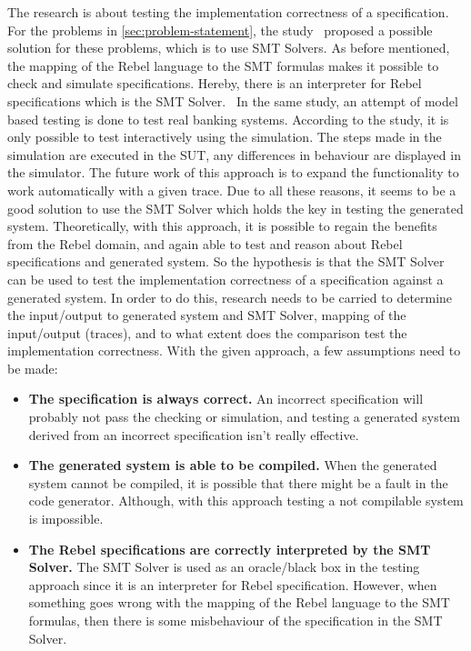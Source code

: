 The research is about testing the implementation correctness of a specification.
For the problems in \autoref{sec:problem-statement}, the
study~\cite[p.3]{stoelcase} proposed a possible solution for these problems,
which is to use SMT Solvers. As before mentioned, the mapping of the Rebel
language to the SMT formulas makes it possible to check and simulate
specifications. Hereby, there is an interpreter for Rebel specifications which
is the SMT Solver.~\cite[p.5]{stoel_storm_vinju_bosman_2016} In the same study,
an attempt of model based testing is done to test real banking systems.
According to the study, it is only possible to test interactively using the
simulation. The steps made in the simulation are executed in the SUT, any
differences in behaviour are displayed in the simulator. The future work of this
approach is to expand the functionality to work automatically with a given
trace. Due to all these reasons, it seems to be a good solution to use the SMT
Solver which holds the key in testing the generated system. Theoretically, with
this approach, it is possible to regain the benefits from the Rebel domain, and
again able to test and reason about Rebel specifications and generated system.
So the hypothesis is that the SMT Solver can be used to test the implementation
correctness of a specification against a generated system. In order to do this,
research needs to be carried to determine the input/output to generated system
and SMT Solver, mapping of the input/output (traces), and to what extent does
the comparison test the implementation correctness. With the given approach, a
few assumptions need to be made:
\begin{itemize}
\item \textbf{The specification is always correct.} An incorrect specification
will probably not pass the checking or simulation, and testing a generated
system derived from an incorrect specification isn't really effective.
\item \textbf{The generated system is able to be compiled.} When the generated
system cannot be compiled, it is possible that there might be a fault in the
code generator. Although, with this approach testing a not compilable system is
impossible.
\item \textbf{The Rebel specifications are correctly interpreted by the SMT
Solver.} The SMT Solver is used as an oracle/black box in the testing approach
since it is an interpreter for Rebel specification. However, when something goes
wrong with the mapping of the Rebel language to the SMT formulas, then there is
some misbehaviour of the specification in the SMT Solver.
\end{itemize}

